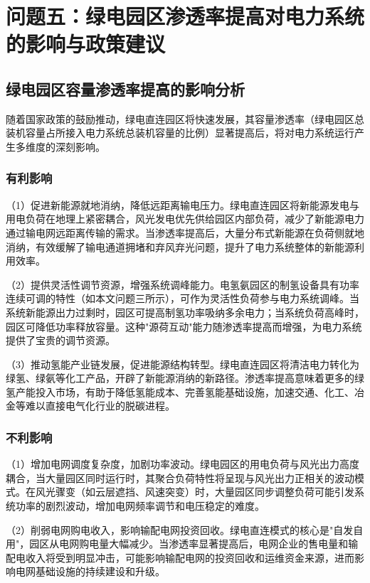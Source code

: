 \section{问题五：绿电园区渗透率提高对电力系统的影响与政策建议}

\subsection{绿电园区容量渗透率提高的影响分析}

随着国家政策的鼓励推动，绿电直连园区将快速发展\cite{ref1}，其容量渗透率（绿电园区总装机容量占所接入电力系统总装机容量的比例）显著提高后，将对电力系统运行产生多维度的深刻影响\cite{ref9}。

\subsubsection{有利影响}

（1）促进新能源就地消纳，降低远距离输电压力。绿电直连园区将新能源发电与用电负荷在地理上紧密耦合，风光发电优先供给园区内部负荷，减少了新能源电力通过输电网远距离传输的需求。当渗透率提高后，大量分布式新能源在负荷侧就地消纳，有效缓解了输电通道拥堵和弃风弃光问题，提升了电力系统整体的新能源利用效率。

（2）提供灵活性调节资源，增强系统调峰能力。电氢氨园区的制氢设备具有功率连续可调的特性（如本文问题三所示），可作为灵活性负荷参与电力系统调峰。当系统新能源出力过剩时，园区可提高制氢功率吸纳多余电力；当系统负荷高峰时，园区可降低功率释放容量。这种"源荷互动"能力随渗透率提高而增强，为电力系统提供了宝贵的调节资源。

（3）推动氢能产业链发展，促进能源结构转型。绿电直连园区将清洁电力转化为绿氢、绿氨等化工产品，开辟了新能源消纳的新路径。渗透率提高意味着更多的绿氢产能投入市场，有助于降低氢能成本、完善氢能基础设施，加速交通、化工、冶金等难以直接电气化行业的脱碳进程。

\subsubsection{不利影响}

（1）增加电网调度复杂度，加剧功率波动。绿电园区的用电负荷与风光出力高度耦合，当大量园区同时运行时，其聚合负荷特性将呈现与风光出力正相关的波动模式。在风光骤变（如云层遮挡、风速突变）时，大量园区同步调整负荷可能引发系统功率的剧烈波动，增加电网频率调节和电压稳定的难度。

（2）削弱电网购电收入，影响输配电网投资回收。绿电直连模式的核心是"自发自用"，园区从电网购电量大幅减少。当渗透率显著提高后，电网企业的售电量和输配电收入将受到明显冲击，可能影响输配电网的投资回收和运维资金来源，进而影响电网基础设施的持续建设和升级。

